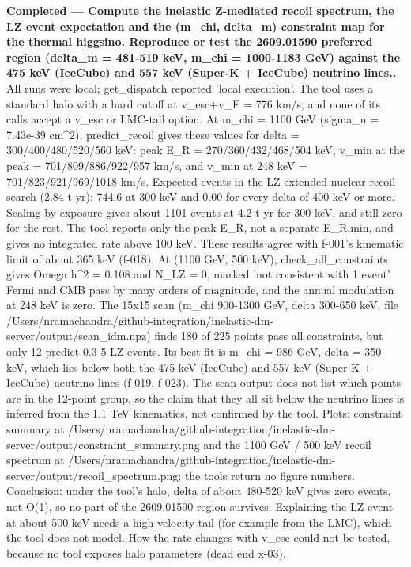 \documentclass[11pt,a4paper]{article}
\begin{document}
\textbf{Completed --- Compute the inelastic Z-mediated recoil spectrum, the LZ event expectation and the (m\_chi, delta\_m) constraint map for the thermal higgsino. Reproduce or test the 2609.01590 preferred region (delta\_m = 481-519 keV, m\_chi = 1000-1183 GeV) against the 475 keV (IceCube) and 557 keV (Super-K + IceCube) neutrino lines..} All runs were local; get\_dispatch reported 'local execution'. The tool uses a standard halo with a hard cutoff at v\_esc+v\_E = 776 km/s, and none of its calls accept a v\_esc or LMC-tail option. At m\_chi = 1100 GeV (sigma\_n = 7.43e-39 cm\textasciicircum{}2), predict\_recoil gives these values for delta = 300/400/480/520/560 keV: peak E\_R = 270/360/432/468/504 keV, v\_min at the peak = 701/809/886/922/957 km/s, and v\_min at 248 keV = 701/823/921/969/1018 km/s. Expected events in the LZ extended nuclear-recoil search (2.84 t-yr): 744.6 at 300 keV and 0.00 for every delta of 400 keV or more. Scaling by exposure gives about 1101 events at 4.2 t-yr for 300 keV, and still zero for the rest. The tool reports only the peak E\_R, not a separate E\_R,min, and gives no integrated rate above 100 keV. These results agree with f-001's kinematic limit of about 365 keV (f-018). At (1100 GeV, 500 keV), check\_all\_constraints gives Omega h\textasciicircum{}2 = 0.108 and N\_LZ = 0, marked 'not consistent with 1 event'. Fermi and CMB pass by many orders of magnitude, and the annual modulation at 248 keV is zero. The 15x15 scan (m\_chi 900-1300 GeV, delta 300-650 keV, file /Users/nramachandra/github-integration/inelastic-dm-server/output/scan\_idm.npz) finds 180 of 225 points pass all constraints, but only 12 predict 0.3-5 LZ events. Its best fit is m\_chi = 986 GeV, delta = 350 keV, which lies below both the 475 keV (IceCube) and 557 keV (Super-K + IceCube) neutrino lines (f-019, f-023). The scan output does not list which points are in the 12-point group, so the claim that they all sit below the neutrino lines is inferred from the 1.1 TeV kinematics, not confirmed by the tool. Plots: constraint summary at /Users/nramachandra/github-integration/inelastic-dm-server/output/constraint\_summary.png and the 1100 GeV / 500 keV recoil spectrum at /Users/nramachandra/github-integration/inelastic-dm-server/output/recoil\_spectrum.png; the tools return no figure numbers. Conclusion: under the tool's halo, delta of about 480-520 keV gives zero events, not O(1), so no part of the 2609.01590 region survives. Explaining the LZ event at about 500 keV needs a high-velocity tail (for example from the LMC), which the tool does not model. How the rate changes with v\_esc could not be tested, because no tool exposes halo parameters (dead end x-03).
\end{document}
